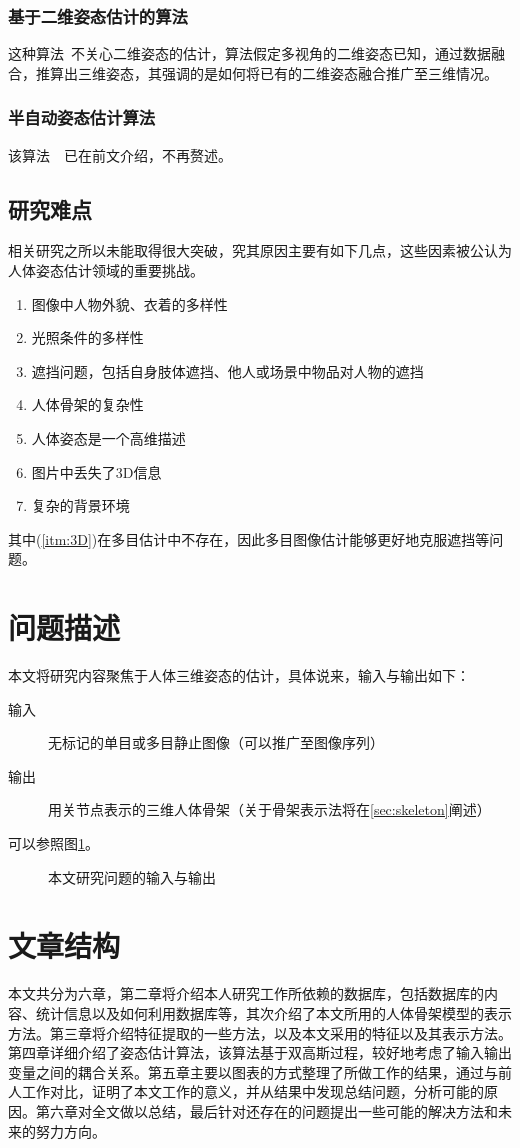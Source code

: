 \subsubsection{基于二维姿态估计的算法}
这种算法~\cite{burenius20133d}不关心二维姿态的估计，算法假定多视角的二维姿态已知，通过数据融合，推算出三维姿态，其强调的是如何将已有的二维姿态融合推广至三维情况。

\subsubsection{半自动姿态估计算法}
该算法~\cite{wei2009modeling}~\cite{wei2010videomocap}已在前文介绍，不再赘述。

\subsection{研究难点}
相关研究之所以未能取得很大突破，究其原因主要有如下几点，这些因素被公认为人体姿态估计领域的重要挑战。
\begin{enumerate}[(1)]
  \item 图像中人物外貌、衣着的多样性
  \item 光照条件的多样性
  \item 遮挡问题，包括自身肢体遮挡、他人或场景中物品对人物的遮挡
  \item 人体骨架的复杂性
  \item 人体姿态是一个高维描述
  \item \label{itm:3D}图片中丢失了3D信息
  \item 复杂的背景环境
\end{enumerate}
其中(\ref{itm:3D})在多目估计中不存在，因此多目图像估计能够更好地克服遮挡等问题。

\section{问题描述}
本文将研究内容聚焦于人体三维姿态的估计，具体说来，输入与输出如下：
\begin{description}
  \item[输入] 无标记的单目或多目静止图像（可以推广至图像序列）
  \item[输出] 用关节点表示的三维人体骨架（关于骨架表示法将在\ref{sec:skeleton}阐述）
\end{description}

可以参照图\ref{fig:inout}。

\begin{figure}[htbp]
    \centering
    \hspace{2cm}
    \caption{本文研究问题的输入与输出}
    \label{fig:inout}
\end{figure}


\section{文章结构}
本文共分为六章，第二章将介绍本人研究工作所依赖的数据库，包括数据库的内容、统计信息以及如何利用数据库等，其次介绍了本文所用的人体骨架模型的表示方法。第三章将介绍特征提取的一些方法，以及本文采用的特征以及其表示方法。第四章详细介绍了姿态估计算法，该算法基于双高斯过程，较好地考虑了输入输出变量之间的耦合关系。第五章主要以图表的方式整理了所做工作的结果，通过与前人工作对比，证明了本文工作的意义，并从结果中发现总结问题，分析可能的原因。第六章对全文做以总结，最后针对还存在的问题提出一些可能的解决方法和未来的努力方向。
